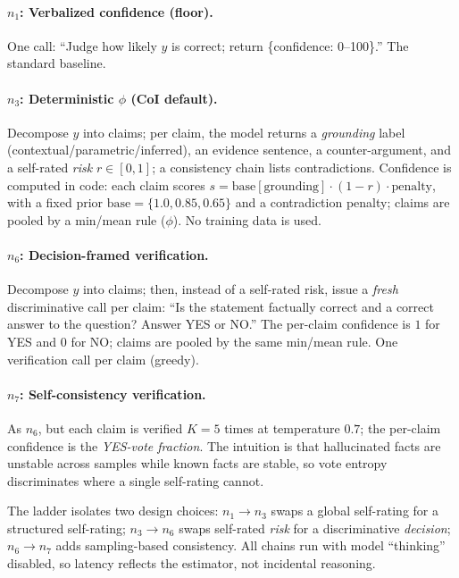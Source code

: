 \documentclass[11pt]{article}
\begin{document}
\paragraph{$n_1$: Verbalized confidence (floor).} One call: ``Judge how likely $y$ is
correct; return \{confidence: 0--100\}.'' The standard baseline.

\paragraph{$n_3$: Deterministic $\phi$ (CoI default).} Decompose $y$ into claims; per
claim, the model returns a \emph{grounding} label (contextual/parametric/inferred), an
evidence sentence, a counter-argument, and a self-rated \emph{risk} $r\in[0,1]$; a
consistency chain lists contradictions. Confidence is computed in code:
each claim scores $s = \mathrm{base}[\text{grounding}]\cdot(1-r)\cdot\text{penalty}$,
with a fixed prior $\mathrm{base}=\{1.0,0.85,0.65\}$ and a contradiction penalty; claims
are pooled by a min/mean rule ($\phi$). No training data is used.

\paragraph{$n_6$: Decision-framed verification.} Decompose $y$ into claims; then, instead
of a self-rated risk, issue a \emph{fresh} discriminative call per claim: ``Is the
statement factually correct and a correct answer to the question? Answer YES or NO.''
The per-claim confidence is $1$ for YES and $0$ for NO; claims are pooled by the same
min/mean rule. One verification call per claim (greedy).

\paragraph{$n_7$: Self-consistency verification.} As $n_6$, but each claim is verified
$K{=}5$ times at temperature $0.7$; the per-claim confidence is the \emph{YES-vote
fraction}. The intuition is that hallucinated facts are unstable across samples while
known facts are stable, so vote entropy discriminates where a single self-rating cannot.

The ladder isolates two design choices: $n_1{\to}n_3$ swaps a global self-rating for a
structured self-rating; $n_3{\to}n_6$ swaps self-rated \emph{risk} for a discriminative
\emph{decision}; $n_6{\to}n_7$ adds sampling-based consistency. All chains run with model
``thinking'' disabled, so latency reflects the estimator, not incidental reasoning.
\end{document}
